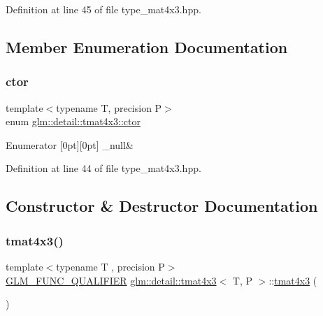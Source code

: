 Definition at line 45 of file type\+\_\+mat4x3.\+hpp.



\subsection{Member Enumeration Documentation}
\mbox{\label{structglm_1_1detail_1_1tmat4x3_ac17f13b8e4946fda04e2c86b280491fe}} 
\subsubsection{\texorpdfstring{ctor}{ctor}}
{\footnotesize\ttfamily template$<$typename T, precision P$>$ \\
enum \hyperlink{structglm_1_1detail_1_1tmat4x3_ac17f13b8e4946fda04e2c86b280491fe}{glm\+::detail\+::tmat4x3\+::ctor}}

\begin{DoxyEnumFields}{Enumerator}
[0pt][0pt]{}\mbox{\label{structglm_1_1detail_1_1tmat4x3_ac17f13b8e4946fda04e2c86b280491fea33e3c4104a445d43d8c7800a5ead890a}} 
\+\_\+null&\\
\hline

\end{DoxyEnumFields}


Definition at line 44 of file type\+\_\+mat4x3.\+hpp.



\subsection{Constructor \& Destructor Documentation}
\mbox{\label{structglm_1_1detail_1_1tmat4x3_a51a17cc460442ce38d5484c5a0150ecf}} 
\subsubsection{\texorpdfstring{tmat4x3()}{tmat4x3()}\hspace{0.1cm}{\footnotesize\ttfamily [1/22]}}
{\footnotesize\ttfamily template$<$typename T , precision P$>$ \\
\hyperlink{setup_8hpp_a33fdea6f91c5f834105f7415e2a64407}{G\+L\+M\+\_\+\+F\+U\+N\+C\+\_\+\+Q\+U\+A\+L\+I\+F\+I\+ER} \hyperlink{structglm_1_1detail_1_1tmat4x3}{glm\+::detail\+::tmat4x3}$<$ T, P $>$\+::\hyperlink{structglm_1_1detail_1_1tmat4x3}{tmat4x3} (\begin{DoxyParamCaption}{ }\end{DoxyParamCaption})}



